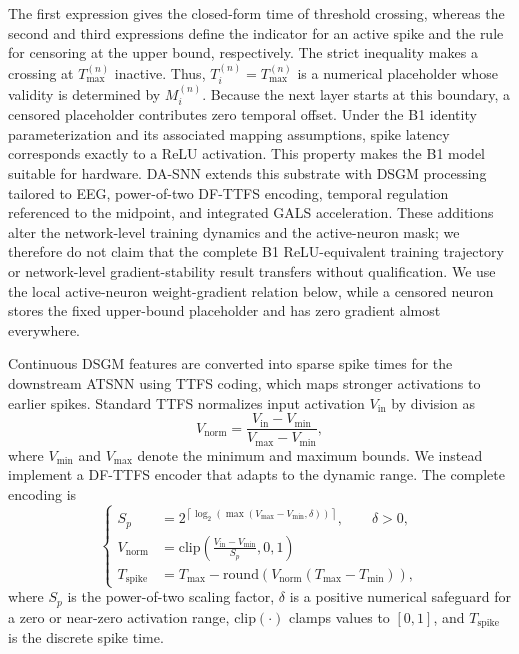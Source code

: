 \documentclass{nsr}
\begin{document}
The first expression gives the closed-form time of threshold crossing, whereas the second and third expressions define the indicator for an active spike and the rule for censoring at the upper bound, respectively. The strict inequality makes a crossing at $T_{\max}^{(n)}$ inactive. Thus, $T_i^{(n)}=T_{\max}^{(n)}$ is a numerical placeholder whose validity is determined by $M_i^{(n)}$. Because the next layer starts at this boundary, a censored placeholder contributes zero temporal offset. Under the B1 identity parameterization and its associated mapping assumptions, spike latency corresponds exactly to a ReLU activation. This property makes the B1 model suitable for hardware. DA-SNN extends this substrate with DSGM processing tailored to EEG, power-of-two DF-TTFS encoding, temporal regulation referenced to the midpoint, and integrated GALS acceleration. These additions alter the network-level training dynamics and the active-neuron mask; we therefore do not claim that the complete B1 ReLU-equivalent training trajectory or network-level gradient-stability result transfers without qualification. We use the local active-neuron weight-gradient relation below, while a censored neuron stores the fixed upper-bound placeholder and has zero gradient almost everywhere.

Continuous DSGM features are converted into sparse spike times for the downstream ATSNN using TTFS coding, which maps stronger activations to earlier spikes. Standard TTFS normalizes input activation $V_{\mathrm{in}}$ by division as
\begin{equation}
V_{\mathrm{norm}} = \frac{V_{\mathrm{in}} - V_{\min}}{V_{\max} - V_{\min}},
\label{eq:standard_ttfs}
\end{equation}
where $V_{\min}$ and $V_{\max}$ denote the minimum and maximum bounds. We instead implement a DF-TTFS encoder that adapts to the dynamic range. The complete encoding is
\begin{equation}
\left\{
\begin{aligned}
S_p &= 2^{\left\lceil \log_2\!\left(\max\!\left(V_{\max}-V_{\min},\delta\right)\right) \right\rceil}, \qquad \delta>0, \\
V_{\mathrm{norm}} &= \mathrm{clip}\left(\frac{V_{\mathrm{in}}-V_{\min}}{S_p}, 0, 1\right) \\
T_{\mathrm{spike}} &= T_{\max} - \mathrm{round}\left(V_{\mathrm{norm}} (T_{\max}-T_{\min})\right),
\end{aligned}
\right.
\label{eq:ttfs_div_free}
\end{equation}
where $S_p$ is the power-of-two scaling factor, $\delta$ is a positive numerical safeguard for a zero or near-zero activation range, $\mathrm{clip}(\cdot)$ clamps values to $[0,1]$, and $T_{\mathrm{spike}}$ is the discrete spike time.
\end{document}
